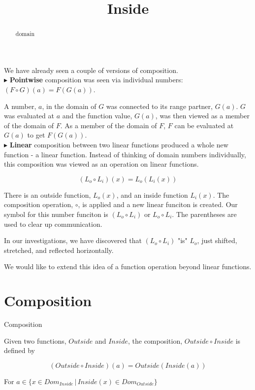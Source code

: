 \documentclass{ximera}
\title{Inside}
\begin{document}
\begin{abstract}
domain
\end{abstract}
\maketitle



We have already seen a couple of versions of composition. \\

$\blacktriangleright$ \textbf{Pointwise} composition was seen via individual numbers: $(F \circ G)(a) = F(G(a))$.

A number, $a$, in the domain of $G$ was connected to its range partner, $G(a)$.  $G$ was evaluated at $a$ and the function value, $G(a)$, was then viewed as a member of the domain of $F$.  As a member of the domain of $F$, $F$ can be evaluated at $G(a)$ to get $F(G(a))$. \\




$\blacktriangleright$ \textbf{Linear} composition between two linear functions produced a whole new function - a linear function.  Instead of thinking of domain numbers individually, this composition was viewed as an operation on linear functions.

\[    (L_o \circ L_i)(x) = L_o(L_i(x))  \]

There is an outside function, $L_o(x)$, and an inside function $L_i(x)$.  The composition operation, $\circ$, is applied and a new linear funciton is created.  Our symbol for this number funciton is $(L_o \circ L_i)$ or $L_o \circ L_i$.  The parentheses are used to clear up communication.

In our investigations, we have discovered that $(L_o \circ L_i)$ "is" $L_o$, just shifted, stretched, and reflected horizontally.


We would like to extend this idea of a function operation beyond linear functions.





\section{Composition}





\begin{definition} Composition


Given two functions, $Outside$ and $Inside$, the composition, $Outside \circ Inside$ is defined by

\[      (Outside \circ Inside)(a) = Outside(Inside(a))        \]

For $ a \in \{  x \in Dom_{Inside} \, | \,    Inside(x) \in Dom_{Outside}  \}$

\end{definition}
\end{document}
